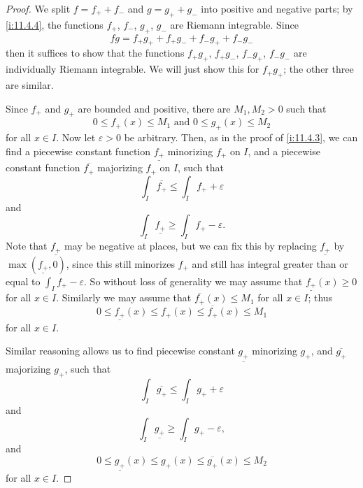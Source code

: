 \begin{proof}
  We split \(f = f_+ + f_-\) and \(g = g_+ + g_-\) into positive and negative parts;
  by \cref{i:11.4.4}, the functions \(f_+\), \(f_-\), \(g_+\), \(g_-\) are Riemann integrable.
  Since
  \[
    fg = f_+ g_+ + f_+ g_- + f_- g_+ + f_- g_-
  \]
  then it suffices to show that the functions \(f_+ g_+\), \(f_+ g_-\), \(f_- g_+\), \(f_- g_-\) are individually Riemann integrable.
  We will just show this for \(f_+ g_+\);
  the other three are similar.

  Since \(f_+\) and \(g_+\) are bounded and positive, there are \(M_1, M_2 > 0\) such that
  \[
    0 \leq f_+(x) \leq M_1 \text{ and } 0 \leq g_+(x) \leq M_2
  \]
  for all \(x \in I\).
  Now let \(\varepsilon > 0\) be arbitrary.
  Then, as in the proof of \cref{i:11.4.3}, we can find a piecewise constant function \(\underline{f_+}\) minorizing \(f_+\) on \(I\), and a piecewise constant function \(\overline{f_+}\) majorizing \(f_+\) on \(I\), such that
  \[
    \int_I \overline{f_+} \leq \int_I f_+ + \varepsilon
  \]
  and
  \[
    \int_I \underline{f_+} \geq \int_I f_+ - \varepsilon.
  \]
  Note that \(\underline{f_+}\) may be negative at places, but we can fix this by replacing \(\underline{f_+}\) by \(\max(\underline{f_+}, 0)\), since this still minorizes \(f_+\) and still has integral greater than or equal to \(\int_I f_+ - \varepsilon\).
  So without loss of generality we may assume that \(\underline{f_+}(x) \geq 0\) for all \(x \in I\).
  Similarly we may assume that \(\overline{f_+}(x) \leq M_1\) for all \(x \in I\);
  thus
  \[
    0 \leq \underline{f_+}(x) \leq f_+(x) \leq \overline{f_+}(x) \leq M_1
  \]
  for all \(x \in I\).

  Similar reasoning allows us to find piecewise constant \(\underline{g_+}\) minorizing \(g_+\), and \(\overline{g_+}\) majorizing \(g_+\), such that
  \[
    \int_I \overline{g_+} \leq \int_I g_+ + \varepsilon
  \]
  and
  \[
    \int_I \underline{g_+} \geq \int_I g_+ - \varepsilon,
  \]
  and
  \[
    0 \leq \underline{g_+}(x) \leq g_+(x) \leq \overline{g_+}(x) \leq M_2
  \]
  for all \(x \in I\).


\end{proof}
